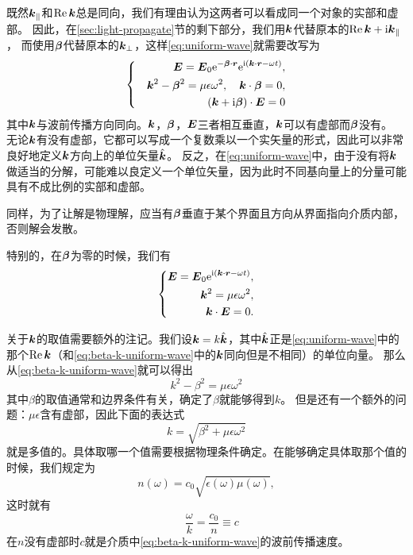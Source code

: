 既然$\vb*{k}_\parallel$和$\Re \vb*{k}$总是同向，我们有理由认为这两者可以看成同一个对象的实部和虚部。
因此，在\ref{sec:light-propagate}节的剩下部分，我们用$\vb*{k}$代替原本的$\Re \vb*{k} + \mathrm{i} \vb*{k}_\parallel$，
而使用$\vb*{\beta}$代替原本的$\vb*{k}_\bot$，这样\eqref{eq:uniform-wave}就需要改写为
\begin{equation}
    \left\{\quad
        \begin{aligned}
            \vb*{E} = \vb*{E}_0 \mathrm{e}^{- \vb*{\beta} \cdot \vb*{r}} \mathrm{e}^{\mathrm{i} (\vb*{k} \cdot \vb*{r} - \omega t)}, \\
            \vb*{k}^2 - \vb*{\beta}^2 = \mu\epsilon\omega^2, \quad \vb*{k} \cdot \vb*{\beta} = 0, \\
            (\vb*{k} + \mathrm{i} \vb*{\beta}) \cdot \vb*{E} = 0
        \end{aligned}
    \right.
    \label{eq:beta-k-uniform-wave}
\end{equation}
其中$\vb*{k}$与波前传播方向同向。$\vb*{k}$，$\vb*{\beta}$，$\vb*{E}$三者相互垂直，$\vb*{k}$可以有虚部而$\vb*{\beta}$没有。
无论$\vb*{k}$有没有虚部，它都可以写成一个复数乘以一个实矢量的形式，因此可以非常良好地定义$\vb*{k}$方向上的单位矢量$\hat{\vb*{k}}$。
反之，在\eqref{eq:uniform-wave}中，由于没有将$\vb*{k}$做适当的分解，可能难以良定义一个单位矢量，因为此时不同基向量上的分量可能具有不成比例的实部和虚部。

同样，为了让解是物理解，应当有$\vb*{\beta}$垂直于某个界面且方向从界面指向介质内部，否则解会发散。

特别的，在$\vb*{\beta}$为零的时候，我们有
\begin{equation}
    \left\{
        \begin{aligned}
            \vb*{E} = \vb*{E}_0 \mathrm{e}^{\mathrm{i}(\vb*{k} \cdot \vb*{r} - \omega t)}, \\
            \vb*{k}^2 = \mu\epsilon \omega^2, \\
            \vb*{k} \cdot \vb*{E} = 0.
        \end{aligned}
    \right.
    \label{eq:beta-zero-uniform-wave}
\end{equation}

关于$\vb*{k}$的取值需要额外的注记。我们设$\vb*{k}=k \hat{\vb*{k}}$，其中$\hat{\vb*{k}}$正是\eqref{eq:uniform-wave}中的那个$\Re\vb*{k}$（和\eqref{eq:beta-k-uniform-wave}中的$\vb*{k}$同向但是不相同）的单位向量。
那么从\eqref{eq:beta-k-uniform-wave}就可以得出
\begin{equation}
    k^2 - \beta^2 = \mu \epsilon \omega^2
\end{equation}
其中$\beta$的取值通常和边界条件有关，确定了$\beta$就能够得到$k$。
但是还有一个额外的问题：$\mu \epsilon$含有虚部，因此下面的表达式
\[
    k = \sqrt{\beta^2 + \mu \epsilon \omega^2}
\]
就是多值的。具体取哪一个值需要根据物理条件确定。在能够确定具体取那个值的时候，我们规定为
\begin{equation}
    n(\omega) = c_0 \sqrt{\epsilon(\omega) \mu(\omega)}, 
    \label{eq:refractivity}
\end{equation}
这时就有
\begin{equation}
    \quad \frac{\omega}{k} = \frac{c_0}{n} \equiv c
    \label{eq:k-and-omega-and-n}
\end{equation}
在$n$没有虚部时$c$就是介质中\eqref{eq:beta-k-uniform-wave}的波前传播速度。

